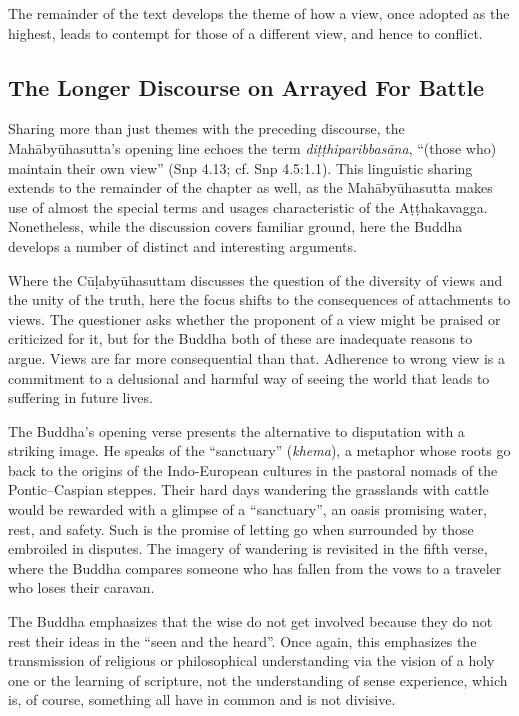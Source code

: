 \documentclass[12pt,openany]{book}%
\begin{document}
The remainder of the text develops the theme of how a view, once adopted as the highest, leads to contempt for those of a different view, and hence to conflict.

\subsection*{The Longer Discourse on Arrayed For Battle}

Sharing more than just themes with the preceding discourse, the \textsanskrit{Mahābyūhasutta}’s opening line echoes the term \textit{\textsanskrit{diṭṭhiparibbasāna}}, “(those who) maintain their own view” (Snp 4.13; cf. Snp 4.5:1.1). This linguistic sharing extends to the remainder of the chapter as well, as the \textsanskrit{Mahābyūhasutta} makes use of almost the special terms and usages characteristic of the \textsanskrit{Aṭṭhakavagga}. Nonetheless, while the discussion covers familiar ground, here the Buddha develops a number of distinct and interesting arguments.

Where the \textsanskrit{Cūḷabyūhasuttam} discusses the question of the diversity of views and the unity of the truth, here the focus shifts to the consequences of attachments to views. The questioner asks whether the proponent of a view might be praised or criticized for it, but for the Buddha both of these are inadequate reasons to argue. Views are far more consequential than that. Adherence to wrong view is a commitment to a delusional and harmful way of seeing the world that leads to suffering in future lives.

The Buddha’s opening verse presents the alternative to disputation with a striking image. He speaks of the “sanctuary” (\textit{khema}), a metaphor whose roots go back to the origins of the Indo-European cultures in the pastoral nomads of the Pontic–Caspian steppes. Their hard days wandering the grasslands with cattle would be rewarded with a glimpse of a “sanctuary”, an oasis promising water, rest, and safety. Such is the promise of letting go when surrounded by those embroiled in disputes. The imagery of wandering is revisited in the fifth verse, where the Buddha compares someone who has fallen from the vows to a traveler who loses their caravan.

The Buddha emphasizes that the wise do not get involved because they do not rest their ideas in the “seen and the heard”. Once again, this emphasizes the transmission of religious or philosophical understanding via the vision of a holy one or the learning of scripture, not the understanding of sense experience, which is, of course, something all have in common and is not divisive.
\end{document}
